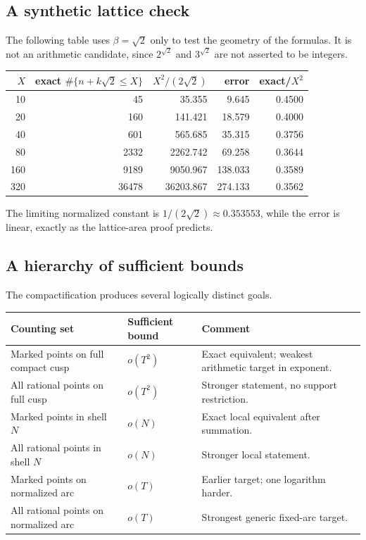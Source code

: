\documentclass[10pt,oneside]{article}
\theoremstyle{definition}
\theoremstyle{remark}
\begin{document}
\subsection{A synthetic lattice check}
The following table uses \(\beta=\sqrt2\) only to test the geometry of the formulas.  It is not an arithmetic candidate, since \(2^{\sqrt2}\) and \(3^{\sqrt2}\) are not asserted to be integers.

\begin{center}
\begin{tabular}{rrrrr}
\toprule
\(X\) & exact \(\#\{n+k\sqrt2\le X\}\) & \(X^2/(2\sqrt2)\) & error & exact/\(X^2\) \\
\midrule
10  & 45    & 35.355 & 9.645  & 0.4500 \\
20  & 160   & 141.421& 18.579 & 0.4000 \\
40  & 601   & 565.685& 35.315 & 0.3756 \\
80  & 2332  & 2262.742&69.258 & 0.3644 \\
160 & 9189  & 9050.967&138.033& 0.3589 \\
320 & 36478 & 36203.867&274.133&0.3562 \\
\bottomrule
\end{tabular}
\end{center}
The limiting normalized constant is \(1/(2\sqrt2)\approx0.353553\), while the error is linear, exactly as the lattice-area proof predicts.

\subsection{A hierarchy of sufficient bounds}
The compactification produces several logically distinct goals.
\begin{center}
\begin{tabularx}{0.97\textwidth}{p{}p{}X}
\toprule
Counting set & Sufficient bound & Comment \\
\midrule
Marked points on full compact cusp & \(o(T^2)\) & Exact equivalent; weakest arithmetic target in exponent. \\
All rational points on full cusp & \(o(T^2)\) & Stronger statement, no support restriction. \\
Marked points in shell \(N\) & \(o(N)\) & Exact local equivalent after summation. \\
All rational points in shell \(N\) & \(o(N)\) & Stronger local statement. \\
Marked points on normalized arc & \(o(T)\) & Earlier target; one logarithm harder. \\
All rational points on normalized arc & \(o(T)\) & Strongest generic fixed-arc target. \\
\bottomrule
\end{tabularx}
\end{center}
\end{document}

